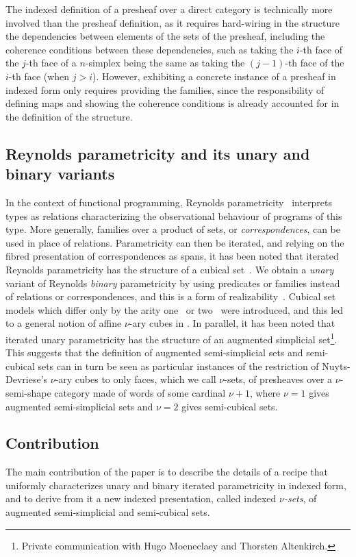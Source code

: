 \documentclass{art.cls/art}
\begin{document}
The indexed definition of a presheaf over a direct category is technically more involved than the presheaf definition, as it requires hard-wiring in the structure the dependencies between elements of the sets of the presheaf, including the coherence conditions between these dependencies, such as taking the $i$-th face of the $j$-th face of a $n$-simplex being the same as taking the $(j-1)$-th face of the $i$-th face (when $j>i$). However, exhibiting a concrete instance of a presheaf in indexed form only requires providing the families, since the responsibility of defining maps and showing the coherence conditions is already accounted for in the definition of the structure.

\subsection*{Reynolds parametricity and its unary and binary variants}
In the context of functional programming, Reynolds parametricity~\cite{reynolds83} interprets types as relations characterizing the observational behaviour of programs of this type. More generally, families over a product of sets, or \emph{correspondences}, can be used in place of relations. Parametricity can then be iterated, and relying on the fibred presentation of correspondences as spans, it has been noted that iterated Reynolds parametricity has the structure of a cubical set~\cite{altenkirch15,moulin16,johann17,moeneclaey21,moeneclaey22phd}. We obtain a \emph{unary} variant of Reynolds \emph{binary} parametricity by using predicates or families instead of relations or correspondences, and this is a form of realizability~\cite{bernardy12,lasson12,moulin16}. Cubical set models which differ only by the arity one~\cite{bernardy15} or two~\cite{bezem13} were introduced, and this led to a general notion of affine $\nu$-ary cubes in \cite{nuytsdevriese24}. In parallel, it has been noted that iterated unary parametricity has the structure of an augmented simplicial set\footnote{Private communication with Hugo Moeneclaey and Thorsten Altenkirch.}. This suggests that the definition of augmented semi-simplicial sets and semi-cubical sets can in turn be seen as particular instances of the restriction of Nuyts-Devriese's $\nu$-ary cubes to only faces, which we call $\nu$-sets, of presheaves over a $\nu$-semi-shape category made of words of some cardinal $\nu+1$, where $\nu=1$ gives augmented semi-simplicial sets and $\nu=2$ gives semi-cubical sets.

\subsection*{Contribution}
The main contribution of the paper is to describe the details of a recipe that uniformly characterizes unary and binary iterated parametricity in indexed form, and to derive from it a new indexed presentation, called indexed \emph{$\nu$-sets}, of augmented semi-simplicial and semi-cubical sets.
\end{document}
